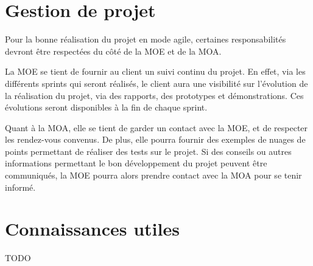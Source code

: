 \documentclass[12pt,titlepage,french]{article}
\begin{document}
\section{Gestion de projet}

Pour la bonne réalisation du projet en mode agile, certaines responsabilités devront être respectées du côté de la MOE et de la MOA.

La MOE se tient de fournir au client un suivi continu du projet. En effet, via les différents sprints qui seront réalisés, le client aura une visibilité sur l'évolution de la réalisation du projet, via des rapports, des prototypes et démonstrations. Ces évolutions seront disponibles à la fin de chaque sprint.

Quant à la MOA, elle se tient de garder un contact avec la MOE, et de respecter les rendez-vous convenus. De plus, elle pourra fournir des exemples de nuages de points permettant de réaliser des tests sur le projet. Si des conseils ou autres informations permettant le bon développement du projet peuvent être communiqués, la MOE pourra alors prendre contact avec la MOA pour se tenir informé.

\section{Connaissances utiles}

TODO
\end{document}
